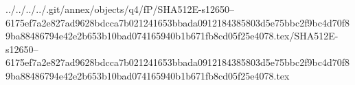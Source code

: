 ../../../../.git/annex/objects/q4/fP/SHA512E-s12650--6175ef7a2e827ad9628bdcca7b021241653bbada0912184385803d5e75bbc2f9bc4d70f89ba88486794e42e2b653b10bad074165940b1b671fb8cd05f25e4078.tex/SHA512E-s12650--6175ef7a2e827ad9628bdcca7b021241653bbada0912184385803d5e75bbc2f9bc4d70f89ba88486794e42e2b653b10bad074165940b1b671fb8cd05f25e4078.tex